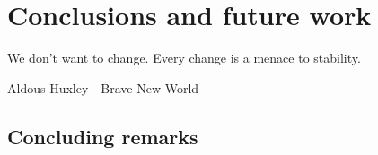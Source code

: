 \chapter{Conclusions and future work}

\begin{FraseCelebre}
  \begin{Frase}
    We don't want to change. Every change is a menace to stability.
  \end{Frase}
  \begin{Fuente}
    Aldous Huxley - Brave New World
  \end{Fuente}
\end{FraseCelebre}

\section{Concluding remarks}
\lip



